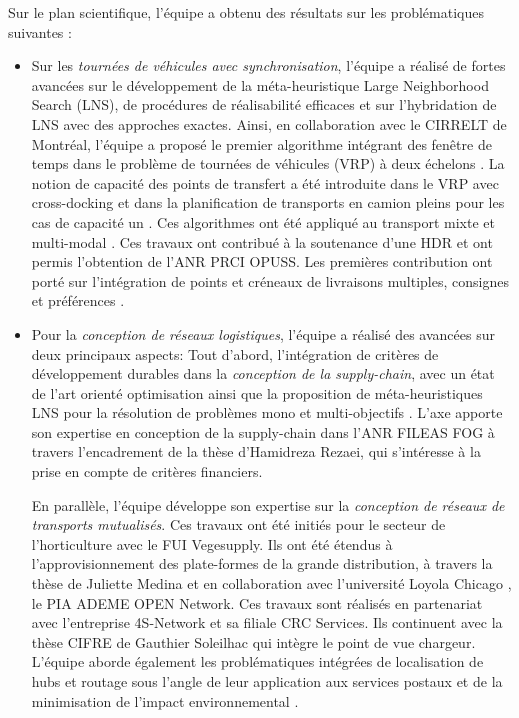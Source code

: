 Sur le plan scientifique, l'équipe a obtenu des résultats sur les problématiques suivantes : 
\begin{itemize}
	\item Sur les \textit{tournées de véhicules avec synchronisation}, l'équipe a réalisé de fortes avancées sur le développement de la méta-heuristique Large Neighborhood Search (LNS), de procédures de réalisabilité efficaces et sur l'hybridation de LNS avec des approches exactes. Ainsi, en collaboration avec le CIRRELT de Montréal, l'équipe a proposé le premier algorithme intégrant des fenêtre de temps dans le problème de tournées de véhicules (VRP) à deux échelons \cite{grangier2015}. La notion de capacité des points de transfert a été introduite dans le VRP avec cross-docking \cite{grangier:hal-01499170,grangier:hal-02277261} et dans la planification de transports en camion pleins pour les cas de capacité un \cite{grimault:hal-01543503,grimault:tel-01343199}. Ces algorithmes ont été appliqué au transport mixte et multi-modal \cite{masson:hal-01068305}.
	Ces travaux ont contribué à la soutenance d'une HDR \cite{lehuede:tel-01441778} et ont permis l'obtention de l'ANR PRCI OPUSS. Les premières contribution ont porté sur l'intégration de points et créneaux de livraisons multiples, consignes et préférences  \cite{dumez:hal-02452252}.
	\item Pour la \textit{conception de réseaux logistiques}, l'équipe a réalisé des avancées sur deux principaux aspects: Tout d'abord, l'intégration de critères de développement durables dans la \textit{conception de la supply-chain}, avec un état de l'art orienté optimisation \cite{eskandarpour:hal-01154605} ainsi que la proposition de méta-heuristiques LNS pour la résolution de problèmes mono et multi-objectifs \cite{eskandarpour:hal-01433630, eskandarpour:hal-02407741}.
	L'axe apporte son expertise en conception de la supply-chain dans l'ANR FILEAS FOG à travers l'encadrement de la thèse d'Hamidreza Rezaei, qui s'intéresse à la prise en compte de critères financiers.

    En parallèle, l'équipe développe son expertise sur la \textit{conception de réseaux de transports mutualisés}. Ces travaux ont été initiés pour le secteur de l'horticulture \cite{tang:hal-01591618} avec le FUI Vegesupply. Ils ont été étendus à l'approvisionnement des plate-formes de la grande distribution, à travers la thèse de Juliette Medina \cite{medina:tel-01460708} et en collaboration avec l'université Loyola Chicago \cite{medina:hal-01689718}, le PIA ADEME OPEN Network. Ces travaux sont réalisés en partenariat avec l'entreprise 4S-Network et sa filiale CRC Services. Ils continuent avec la thèse CIFRE de Gauthier Soleilhac qui intègre le point de vue chargeur. 
    L'équipe aborde également les problématiques intégrées de localisation de hubs et routage sous l'angle de leur application aux services postaux \cite{bostel:hal-01320357,yang:hal-02524875} et de la minimisation de l'impact environnemental \cite{yang:these}.
    

\end{itemize}
